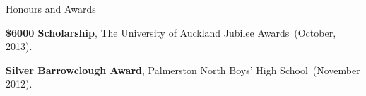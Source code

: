 \documentclass[11pt]{tracv}
\begin{document}



%
%
%
%

%
%

%
%

\begin{hangingsection}{Honours and Awards}

	\hangingentry \textbf{\$6000 Scholarship}, The University of Auckland Jubilee Awards~(October, 2013).

	\hangingentry \textbf{Silver Barrowclough Award}, Palmerston North Boys' High School~(November 2012).

%

\end{hangingsection}
\end{document}
